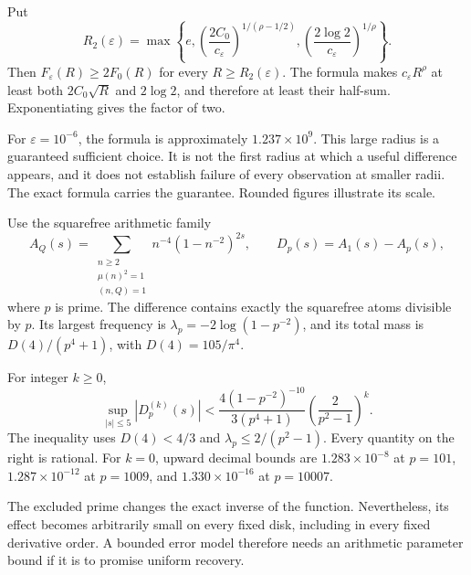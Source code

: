 Put
\[
R_2(\varepsilon)=\max\!\left\{
 e,\left(\frac{2C_0}{c_\varepsilon}\right)^{1/(\rho-1/2)},
 \left(\frac{2\log2}{c_\varepsilon}\right)^{1/\rho}\right\}.
\]
Then $F_\varepsilon(R)\ge2F_0(R)$ for every $R\ge R_2(\varepsilon)$.
The formula makes $c_\varepsilon R^\rho$ at least both
$2C_0\sqrt R$ and $2\log2$, and therefore at least their half-sum.
Exponentiating gives the factor of two.

For $\varepsilon=10^{-6}$, the formula is approximately
$1.237\times10^9$. This large radius is a guaranteed sufficient choice.
It is not the first radius at which a useful difference appears, and it does
not establish failure of every observation at smaller radii.
The exact formula carries the guarantee. Rounded figures illustrate its scale.

Use the squarefree arithmetic family
\[
A_Q(s)=\sum_{\substack{n\ge2\\\mu(n)^2=1\\(n,Q)=1}}
 n^{-4}(1-n^{-2})^{2s},
\qquad D_p(s)=A_1(s)-A_p(s),
\]
where $p$ is prime. The difference contains exactly the squarefree atoms
divisible by $p$. Its largest frequency is
$\lambda_p=-2\log(1-p^{-2})$, and its total mass is
$D(4)/(p^4+1)$, with $D(4)=105/\pi^4$.


For integer $k\ge0$,
\[
\sup_{|s|\le5}|D_p^{(k)}(s)|
<\frac{4(1-p^{-2})^{-10}}{3(p^4+1)}
 \left(\frac{2}{p^2-1}\right)^k.
\]
The inequality uses $D(4)<4/3$ and
$\lambda_p\le2/(p^2-1)$. Every quantity on the right is rational.
For $k=0$, upward decimal bounds are $1.283\times10^{-8}$ at $p=101$,
$1.287\times10^{-12}$ at $p=1009$, and $1.330\times10^{-16}$ at $p=10007$.

The excluded prime changes the exact inverse of the function.
Nevertheless, its effect becomes arbitrarily small on every fixed disk,
including in every fixed derivative order. A bounded error model therefore
needs an arithmetic parameter bound if it is to promise uniform recovery.

